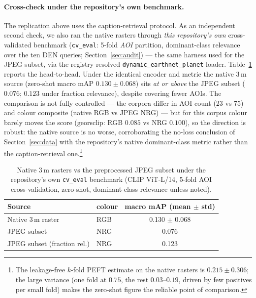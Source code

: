 \documentclass{article}
\begin{document}
\paragraph{Cross-check under the repository's own benchmark.}
The replication above uses the caption-retrieval protocol. As an independent
second check, we also ran the native rasters through \emph{this repository's own}
cross-validated benchmark (\texttt{cv\_eval}: 5-fold \emph{AOI} partition,
dominant-class relevance over the ten DEN queries; Section~\ref{sec:audit}) --- the
same harness used for the JPEG subset, via the registry-resolved
\texttt{dynamic\_earthnet\_planet} loader. Table~\ref{tab:native3mcv} reports the
head-to-head. Under the identical encoder and metric the native 3\,m source
(zero-shot macro mAP $0.130\pm0.068$) sits \emph{at or above} the JPEG subset
($0.076$; $0.123$ under fraction relevance), despite covering fewer AOIs. The
comparison is not fully controlled --- the corpora differ in AOI count (23 vs 75)
and colour composite (native RGB vs JPEG NRG) --- but for this corpus colour barely
moves the score (georsclip: RGB $0.085$ vs NRG $0.100$), so the direction is robust:
the native source is no worse, corroborating the no-loss conclusion of
Section~\ref{sec:data} with the repository's native dominant-class metric rather than
the caption-retrieval one.\footnote{The leakage-free $k$-fold PEFT estimate on the
native rasters is $0.215\pm0.306$; the large variance (one fold at $0.75$, the rest
$0.03$--$0.19$, driven by few positives per small fold) makes the zero-shot figure
the reliable point of comparison.}

\begin{table}[H]
    \centering
    \caption{Native 3\,m rasters vs the preprocessed JPEG subset under the
    repository's own \texttt{cv\_eval} benchmark (CLIP ViT-L/14, 5-fold AOI
    cross-validation, zero-shot, dominant-class relevance unless noted).}
    \label{tab:native3mcv}
    \begin{tabular}{llc}
        \toprule
        \textbf{Source} & \textbf{colour} & \textbf{macro mAP (mean $\pm$ std)} \\
        \midrule
        Native 3\,m raster & RGB & 0.130 $\pm$ 0.068 \\
        JPEG subset                    & NRG & 0.076 \\
        JPEG subset (fraction rel.)    & NRG & 0.123 \\
        \bottomrule
    \end{tabular}
\end{table}
\end{document}
